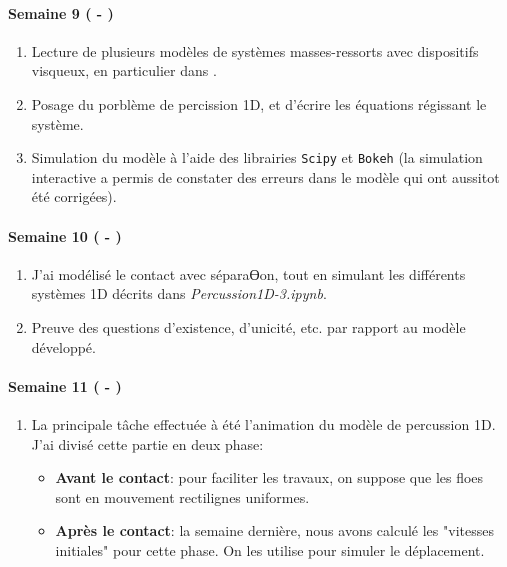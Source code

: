 \paragraph{Semaine 9 ( - )} 
\begin{enumerate}
    \item Lecture de plusieurs modèles de systèmes masses-ressorts avec dispositifs visqueux, en particulier dans \parencite{homodeling}.
    \item Posage du porblème de percission 1D, et d'écrire les équations régissant le système.
    \item Simulation du modèle à l'aide des librairies \verb|Scipy| et \verb|Bokeh| (la simulation interactive a permis de constater des erreurs dans le modèle qui ont aussitot été corrigées). 
\end{enumerate}
  

\paragraph{Semaine 10 ( - )} 
\begin{enumerate}
    \item J'ai modélisé le contact avec séparaƟon, tout en simulant les différents systèmes 1D décrits dans \emph{Percussion1D-3.ipynb}. 
    \item Preuve des questions d'existence, d'unicité, etc. par rapport au modèle développé.
\end{enumerate}


\paragraph{Semaine 11 ( - )} 
\begin{enumerate}
    \item La principale tâche effectuée à été l'animation du modèle de percussion 1D. J'ai divisé cette partie en deux phase:
    \begin{itemize}
        \item \textbf{Avant le contact}: pour faciliter les travaux, on suppose que les floes sont en mouvement rectilignes uniformes.
        \item \textbf{Après le contact}: la semaine dernière, nous avons calculé les "vitesses initiales" pour cette phase. On les utilise pour simuler le déplacement.
    \end{itemize}
\end{enumerate}


